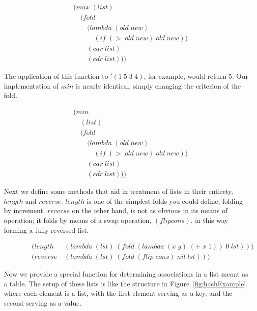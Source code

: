 \begin{figure}[htp]
\caption{}\label{fig:maxDef}
\begin{align*}
& (max \; (list)
\\& \quad (fold \; 
\\& \qquad (lambda \; (old \; new)
\\& \qquad \quad (if \; (> \; old \; new) \; old \; new))
\\& \qquad (car \; list)
\\& \qquad (cdr \; list)))
\end{align*}
\end{figure}

The application of this function to $'(1 \; 5 \; 3 \; 4)$, for example, would
return 5. Our implementation of $min$ is nearly identical, simply changing the
criterion of the fold.

\begin{figure}[htp]
\caption{}\label{fig:minDef}
\begin{align*}
& (min \; 
\\& \quad (list)
\\& \quad (fold \; 
\\& \qquad (lambda \; (old \; new)
\\& \qquad \quad (if \; (> \; old \; new) \; old \; new))
\\& \qquad (car \; list)
\\& \qquad (cdr \; list)))
\end{align*}
\end{figure}

Next we define some methods that aid in treatment of lists in their entirety, 
$length$ and $reverse$. $length$ is one of the simplest folds you could define, 
folding by increment. $reverse$ on the other hand, is not as obvious in its means 
of operation; it folds by means of a swap operation, $(flip cons)$, in this way 
forming a fully reversed list.

\begin{figure}[htp]
\caption{}\label{fig:lengthAndRevDefs}
\begin{align*}
& (length \; &(lambda \; (lst) \; (fold \; (lambda \; (x \; y) \; (+ \; x \; 1)) \; 0 \; lst)))
\\& (reverse \; &(lambda \; (lst) \; (fold \; (flip \; cons) \; nil \; lst)))
\end{align*}
\end{figure}

Now we provide a special function for determining associations in a list meant
as a table. The setup of these lists is like the structure in
Figure~\ref{fig:hashExample}, where each element is a list, with the first
element serving as a key, and the second serving as a value.

